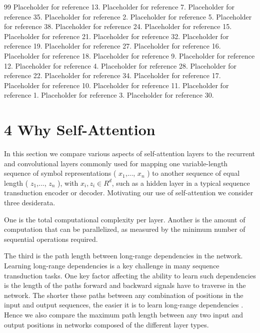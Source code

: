 \documentclass[conference]{IEEEtran}
\begin{document}
\begin{thebibliography}{99}
 Placeholder for reference 13.
 Placeholder for reference 7.
 Placeholder for reference 35.
 Placeholder for reference 2.
 Placeholder for reference 5.
 Placeholder for reference 38.
 Placeholder for reference 24.
 Placeholder for reference 15.
 Placeholder for reference 21.
 Placeholder for reference 32.
 Placeholder for reference 19.
 Placeholder for reference 27.
 Placeholder for reference 16.
 Placeholder for reference 18.
 Placeholder for reference 9.
 Placeholder for reference 12.
 Placeholder for reference 4.
 Placeholder for reference 28.
 Placeholder for reference 22.
 Placeholder for reference 34.
 Placeholder for reference 17.
 Placeholder for reference 10.
 Placeholder for reference 11.
 Placeholder for reference 1.
 Placeholder for reference 3.
 Placeholder for reference 30.
\end{thebibliography}

\section{4 Why Self-Attention}

In this section we compare various aspects of self-attention layers to the recurrent and convolutional layers commonly used for mapping one variable-length sequence of symbol representations ( $x_1$,..., $x_n$ ) to another sequence of equal length ( $z_1$,..., $z_n$ ), with $x_i, z_i \in R^d$, such as a hidden layer in a typical sequence transduction encoder or decoder. Motivating our use of self-attention we consider three desiderata.

One is the total computational complexity per layer. Another is the amount of computation that can be parallelized, as measured by the minimum number of sequential operations required.

The third is the path length between long-range dependencies in the network. Learning long-range dependencies is a key challenge in many sequence transduction tasks. One key factor affecting the ability to learn such dependencies is the length of the paths forward and backward signals have to traverse in the network. The shorter these paths between any combination of positions in the input and output sequences, the easier it is to learn long-range dependencies \cite{ref12}. Hence we also compare the maximum path length between any two input and output positions in networks composed of the different layer types.
\end{document}
